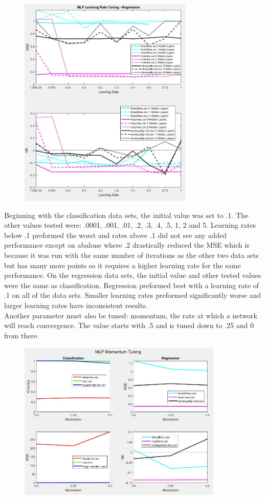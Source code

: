 \documentclass[twoside,11pt]{article}
\begin{document}
\begin{figure}[h]
	\centering
	\includegraphics[height=4in]{FINAL_FIGS/MLP_LR_TUNING_REG.JPG}
\end{figure}
Beginning with the classification data sets, the initial value was set to .1. The other values tested were: .0001, .001, .01, .2, .3, .4, .5, 1, 2 and 5. Learning rates below .1 preformed the worst and rates above .1 did not see any added performance except on abalone where .2 drastically reduced the MSE which is because it was run with the same number of iterations as the other two data sets but has many more points so it requires a higher learning rate for the same performance.
On the regression data sets, the initial value and other tested values were the same as classification. Regression preformed best with a learning rate of .1 on all of the data sets. Smaller learning rates preformed significantly worse and larger learning rates have inconsistent results. \\
Another parameter must also be tuned: momentum, the rate at which a network will reach convergence. The value starts with .5 and is tuned down to .25 and 0 from there. \\
\begin{figure}[h]
	\centering
	\includegraphics[height=3in]{FINAL_FIGS/MLP_MOMENTUM.JPG}
\end{figure}
\end{document}
